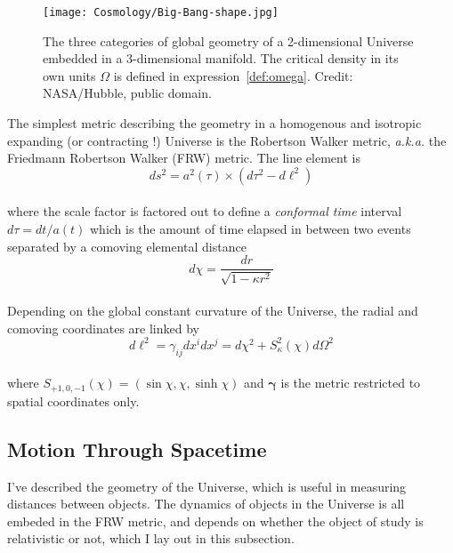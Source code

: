 \begin{figure}
\begin{center}
\texttt{[image: Cosmology/Big-Bang-shape.jpg]}
\caption{The three categories of global geometry of a 2-dimensional Universe embedded in a 3-dimensional manifold. The critical density in its own units $\Omega$ is defined in expression~\ref{def:omega}. Credit: NASA/Hubble, public domain.}
\label{fig:geocurv}
\end{center}
\end{figure}


The simplest metric describing the geometry in a homogenous and isotropic expanding (or contracting !) Universe is the Robertson Walker metric, \textit{a.k.a.} the Friedmann Robertson Walker (FRW) metric. The line element is\\

\begin{equation}
\label{eq:RWmetric}
ds^2 = a^2 (\tau) \times \left( d\tau^2 - d\ell^2 \right)
\end{equation} \\ where the scale factor is factored out to define a \emph{conformal time} interval $d\tau = dt/a(t)$ which is the amount of time elapsed in between two events separated by a comoving elemental distance\\

\begin{equation}
d\chi = \frac{dr}{\sqrt{1 - \kappa r^2}}
\end{equation} \\ Depending on the global constant curvature of the Universe, the radial and comoving coordinates are linked by\\

\begin{equation}
\label{eq:RWmetric_space}
d\ell^2 = \gamma_{ij} dx^i dx^j = d\chi^2 + S^2_{\kappa} (\chi) d\Omega^2
\end{equation} \\ where $S_{+1, 0, -1} (\chi) = (\sin \chi, \chi, \sinh \chi)$ and $\pmb{\gamma}$ is the metric restricted to spatial coordinates only. 


\subsection{Motion Through Spacetime}

I've described the geometry of the Universe, which is useful in measuring distances between objects. The dynamics of objects in the Universe is all embeded in the FRW metric, and depends on whether the object of study is relativistic or not, which I lay out in this subsection.

